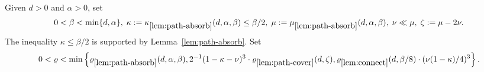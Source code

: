 \documentclass[11pt,reqno]{amsart}
\def\pcref{\mathrm{\ref{lem:path-cover}}}
\def\conref{\mathrm{\ref{lem:connect}}}
\def\absref{\mathrm{\ref{lem:path-absorb}}}
\begin{document}
%
%
%


Given $d> 0$ and $\alpha >0$, set 
\begin{equation}\label{eq:kmg}
0 < \beta < \min\{d,\alpha\},\; \kappa := \kappa_{\absref}(d,\alpha,\beta)\leq \beta/2,\; \mu := \mu_{\absref}(d,\alpha,\beta),\; \nu \ll \mu,\; \zeta:= \mu - 2\nu. 
\end{equation}
The inequality $\kappa \leq \beta/2$ is supported by Lemma~\ref{lem:path-absorb}. 
Set 
\begin{equation}\label{eq:rho-final}
0< \rho < \min \left\{\rho_{\absref}(d,\alpha,\beta),2^{-1}(1-\kappa-\nu)^3  \cdot \rho_{\pcref}(d,\zeta), \rho_{\conref}(d,\beta/8)\cdot(\nu(1-\kappa)/4)^3\right\}.
\end{equation}
\end{document}
